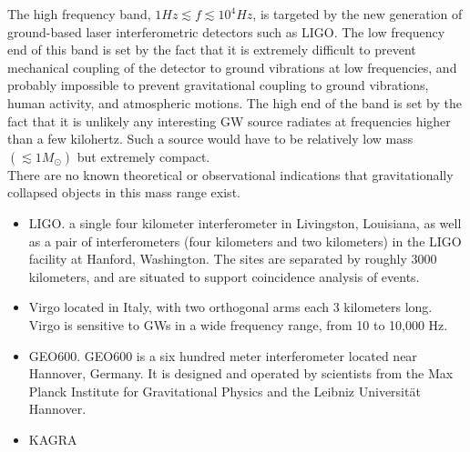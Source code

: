 \documentclass[binding=0.6cm, LaM]{sapthesis}
\begin{document}
	The high frequency band, $1Hz \apprle f \apprle 10^4 Hz$, is targeted by 
	the new generation of ground-based laser interferometric detectors such as LIGO.
	The low frequency end of this band is set by the fact that it is extremely difficult 
	to prevent mechanical coupling of the detector to ground vibrations at low frequencies,
	and probably impossible to prevent gravitational coupling to ground vibrations, human activity, and atmospheric motions.
	The high end of the band is set by the fact that it is unlikely any interesting GW source 
	radiates at frequencies higher than a few kilohertz. Such a source would have to be relatively
	low mass $(\apprle 1M_{\odot})$ but extremely compact. \\
	There are no known theoretical or observational indications that gravitationally collapsed objects in this mass range exist.

\begin{itemize}
			\item LIGO.
			      a single four kilometer interferometer in Livingston, Louisiana, 
			      as well as a pair of interferometers (four kilometers and two kilometers) in the LIGO facility at Hanford, Washington.
			      The sites are separated by roughly 3000 kilometers, and are situated to support coincidence analysis of events.
  			\item Virgo located in Italy, with two orthogonal arms each 3 kilometers long. 
			      Virgo is sensitive to GWs in a wide frequency range, from 10 to 10,000 Hz. 
  			\item GEO600. GEO600 is a six hundred meter interferometer located near Hannover, 
			      Germany. It is designed and operated by scientists from the 
			      Max Planck Institute for Gravitational Physics and the Leibniz Universität Hannover.
  			\item KAGRA 

\end{itemize}
\end{document}
